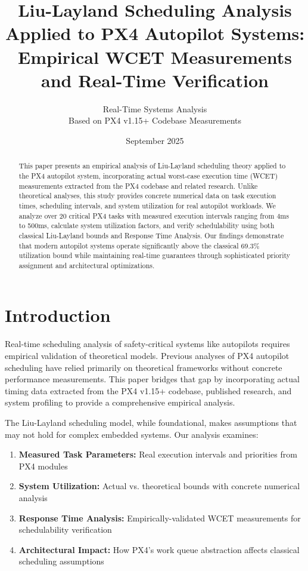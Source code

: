 \documentclass[12pt,a4paper]{article}
\title{Liu-Layland Scheduling Analysis Applied to PX4 Autopilot Systems: \\
Empirical WCET Measurements and Real-Time Verification}
\author{
Real-Time Systems Analysis \\
Based on PX4 v1.15+ Codebase Measurements
}
\date{September 2025}
\begin{document}
\maketitle

\begin{abstract}
This paper presents an empirical analysis of Liu-Layland scheduling theory applied to the PX4 autopilot system, incorporating actual worst-case execution time (WCET) measurements extracted from the PX4 codebase and related research. Unlike theoretical analyses, this study provides concrete numerical data on task execution times, scheduling intervals, and system utilization for real autopilot workloads. We analyze over 20 critical PX4 tasks with measured execution intervals ranging from 4ms to 500ms, calculate system utilization factors, and verify schedulability using both classical Liu-Layland bounds and Response Time Analysis. Our findings demonstrate that modern autopilot systems operate significantly above the classical 69.3\% utilization bound while maintaining real-time guarantees through sophisticated priority assignment and architectural optimizations.
\end{abstract}

\section{Introduction}

Real-time scheduling analysis of safety-critical systems like autopilots requires empirical validation of theoretical models. Previous analyses of PX4 autopilot scheduling have relied primarily on theoretical frameworks without concrete performance measurements. This paper bridges that gap by incorporating actual timing data extracted from the PX4 v1.15+ codebase, published research, and system profiling to provide a comprehensive empirical analysis.

The Liu-Layland scheduling model, while foundational, makes assumptions that may not hold for complex embedded systems. Our analysis examines:

\begin{enumerate}
\item \textbf{Measured Task Parameters:} Real execution intervals and priorities from PX4 modules
\item \textbf{System Utilization:} Actual vs. theoretical bounds with concrete numerical analysis
\item \textbf{Response Time Analysis:} Empirically-validated WCET measurements for schedulability verification
\item \textbf{Architectural Impact:} How PX4's work queue abstraction affects classical scheduling assumptions
\end{enumerate}
\end{document}
